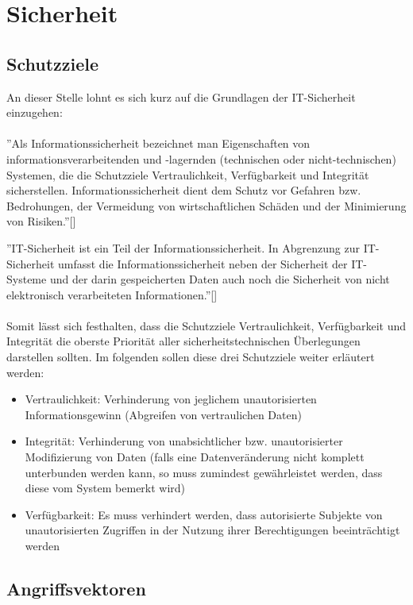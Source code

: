 \documentclass[12pt,a4paper,parskip=half]{scrreprt}
\begin{document}
\chapter{Sicherheit}


\section{Schutzziele}

An dieser Stelle lohnt es sich kurz auf die Grundlagen der IT-Sicherheit einzugehen:
\\
\\
''Als Informationssicherheit bezeichnet man Eigenschaften von informationsverarbeitenden und -lagernden (technischen oder nicht-technischen) Systemen, die die
Schutzziele Vertraulichkeit, Verfügbarkeit und Integrität sicherstellen.
Informationssicherheit dient dem Schutz vor Gefahren bzw. Bedrohungen, der Vermeidung von wirtschaftlichen Schäden und der Minimierung von Risiken.''[\cite{ScriptITSicherheit}]

''IT-Sicherheit ist ein Teil der Informationssicherheit. In Abgrenzung zur IT-Sicherheit umfasst die
Informationssicherheit neben der Sicherheit der IT-Systeme und der darin gespeicherten Daten auch noch die Sicherheit von nicht elektronisch verarbeiteten Informationen.''[\cite{ScriptITSicherheit}]
\\
\\
Somit lässt sich festhalten, dass die Schutzziele Vertraulichkeit, Verfügbarkeit und Integrität die oberste Priorität aller sicherheitstechnischen Überlegungen darstellen sollten. Im folgenden sollen diese drei Schutzziele weiter erläutert werden:

\begin{itemize}
	\item Vertraulichkeit: Verhinderung von jeglichem unautorisierten Informationsgewinn (Abgreifen von vertraulichen Daten)
	\item Integrität: Verhinderung von unabsichtlicher bzw. unautorisierter Modifizierung von Daten (falls eine Datenveränderung nicht komplett unterbunden werden kann, so muss zumindest gewährleistet werden, dass diese vom System bemerkt wird)
	\item Verfügbarkeit: Es muss verhindert werden, dass autorisierte Subjekte von unautorisierten Zugriffen in der Nutzung ihrer Berechtigungen beeinträchtigt werden
\end{itemize}


\section{Angriffsvektoren}
\end{document}
